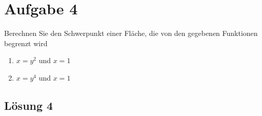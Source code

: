 \documentclass[main.tex]{subfiles}
\begin{document}
\section{Aufgabe 4}
Berechnen Sie den Schwerpunkt einer Fläche, die von den gegebenen Funktionen begrenzt wird
\begin{enumerate}
    \item $x = y^2$ \quad und \quad $x = 1$
    \item $x = y^4$ \quad und \quad $x = 1$
\end{enumerate}

\subsection{Lösung 4}
\end{document}
